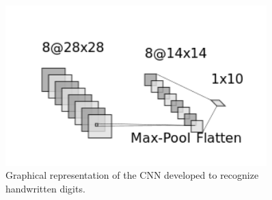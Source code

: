 \begin{figure}[htb]
\centering
\includegraphics[width=0.9\textwidth]{figures/cnn_2d.png}
\caption{Graphical representation of the CNN developed to recognize handwritten digits.}
\label{fig:cnn2d}
\end{figure}

